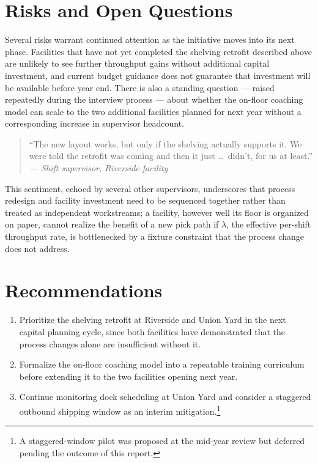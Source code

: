 \documentclass[11pt]{article}
\begin{document}
\section{Risks and Open Questions}
Several risks warrant continued attention as the initiative moves into its
next phase. Facilities that have not yet completed the shelving retrofit
described above are unlikely to see further throughput gains without
additional capital investment, and current budget guidance does not
guarantee that investment will be available before year end. There is also
a standing question --- raised repeatedly during the interview process ---
about whether the on-floor coaching model can scale to the two additional
facilities planned for next year without a corresponding increase in
supervisor headcount.

\begin{quote}
``The new layout works, but only if the shelving actually supports it. We
were told the retrofit was coming and then it just \dots\ didn't, for us
at least.''\\
\textit{--- Shift supervisor, Riverside facility}
\end{quote}

This sentiment, echoed by several other supervisors, underscores that
process redesign and facility investment need to be sequenced together
rather than treated as independent workstreams; a facility, however well
its floor is organized on paper, cannot realize the benefit of a new pick
path if $\lambda$, the effective per-shift throughput rate, is bottlenecked
by a fixture constraint that the process change does not address.

\section{Recommendations}
\begin{enumerate}
  \item Prioritize the shelving retrofit at Riverside and Union Yard in the
  next capital planning cycle, since both facilities have demonstrated
  that the process changes alone are insufficient without it.
  \item Formalize the on-floor coaching model into a repeatable training
  curriculum before extending it to the two facilities opening next year.
  \item Continue monitoring dock scheduling at Union Yard and consider a
  staggered outbound shipping window as an interim mitigation.\footnote{A
  staggered-window pilot was proposed at the mid-year review but deferred
  pending the outcome of this report.}
\end{enumerate}
\end{document}
